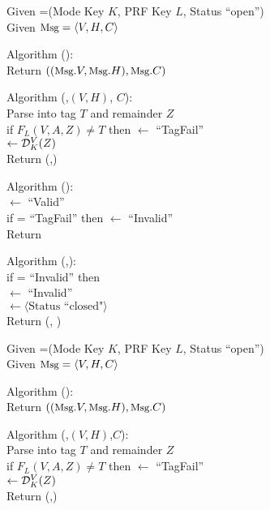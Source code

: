 \begin{figure}
{
Given =(Mode Key $K$, PRF Key $L$, Status
``open'') \\
Given $\textrm{\small Msg} =\langle V,H,C \rangle$

\medskip
Algorithm ():\\
\nudge Return $\left((\textrm{\small Msg}.V,\textrm{\small Msg}.H),\textrm{\small Msg}.C\right)$

\medskip
Algorithm (,$(V,H)$, $C$):\\
\nudge Parse  into tag $T$ and remainder $Z$\\ 
\nudge if $F_L(V,A,Z) \neq T$ then  $\gets$ ``TagFail''\\
\nudge{} $\gets \mathcal{D}_K^{V}(Z)$\\
\nudge Return (,)

\medskip
Algorithm ():\\
\nudge {} $\gets$ ``Valid''\\
\nudge if  =  ``TagFail'' then  $\gets$ ``Invalid''\\
\nudge Return 

\medskip
Algorithm (,):\\
\nudge if  = ``Invalid'' then \\
\nudge\nudge {} $\gets$ ``Invalid'' \\
\nudge\nudge {} $\gets \langle
\mbox{Status ``closed"} \rangle$\\
\nudge Return (, )
}
{
Given =(Mode Key $K$, PRF Key $L$, Status
``open'') \\
Given $\textrm{\small Msg} =\langle V,H,C \rangle$

\medskip
Algorithm ():\\
\nudge Return $\left((\textrm{\small Msg}.V, \textrm{\small Msg}.H),\textrm{\small Msg}.C\right)$

\medskip
Algorithm (,$(V,H)$,$C$):\\
\nudge Parse  into tag $T$ and remainder $Z$\\ 
\nudge if $F_L(V,A,Z) \neq T$ then  $\gets$ ``TagFail''\\
\nudge{} $\gets \mathcal{D}_K^{V}(Z)$\\
\nudge Return (,)

}
\end{figure}
